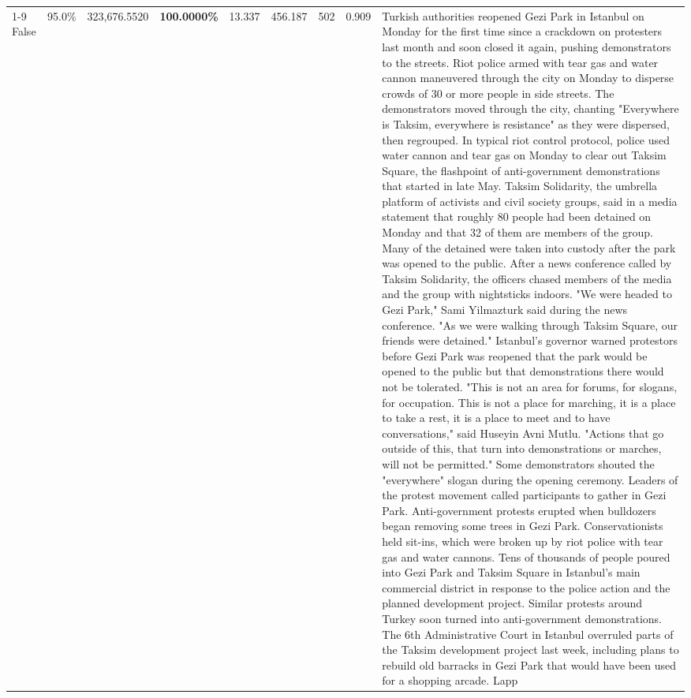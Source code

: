 \begin{table}[H]
\begin{tabular}{lllrlllll}
\cline{1-9}
False & 95.0\% & 323,676.5520 & \bfseries \color{red} 100.0000\% & 13.337 & 456.187 & 502 & 0.909 & Turkish authorities reopened Gezi Park in Istanbul on Monday for the first time since a crackdown on protesters last month and soon closed it again, pushing demonstrators to the streets. Riot police armed with tear gas and water cannon maneuvered through the city on Monday to disperse crowds of 30 or more people in side streets. The demonstrators moved through the city, chanting "Everywhere is Taksim, everywhere is resistance" as they were dispersed, then regrouped. In typical riot control protocol, police used water cannon and tear gas on Monday to clear out Taksim Square, the flashpoint of anti-government demonstrations that started in late May. Taksim Solidarity, the umbrella platform of activists and civil society groups, said in a media statement that roughly 80 people had been detained on Monday and that 32 of them are members of the group. Many of the detained were taken into custody after the park was opened to the public. After a news conference called by Taksim Solidarity, the officers chased members of the media and the group with nightsticks indoors. "We were headed to Gezi Park," Sami Yilmazturk said during the news conference. "As we were walking through Taksim Square, our friends were detained." Istanbul's governor warned protestors before Gezi Park was reopened that the park would be opened to the public but that demonstrations there would not be tolerated. "This is not an area for forums, for slogans, for occupation. This is not a place for marching, it is a place to take a rest, it is a place to meet and to have conversations," said Huseyin Avni Mutlu. "Actions that go outside of this, that turn into demonstrations or marches, will not be permitted." Some demonstrators shouted the "everywhere" slogan during the opening ceremony. Leaders of the protest movement called participants to gather in Gezi Park. Anti-government protests erupted when bulldozers began removing some trees in Gezi Park. Conservationists held sit-ins, which were broken up by riot police with tear gas and water cannons. Tens of thousands of people poured into Gezi Park and Taksim Square in Istanbul's main commercial district in response to the police action and the planned development project. Similar protests around Turkey soon turned into anti-government demonstrations. The 6th Administrative Court in Istanbul overruled parts of the Taksim development project last week, including plans to rebuild old barracks in Gezi Park that would have been used for a shopping arcade. Lapp \\

\end{tabular}
\end{table}
